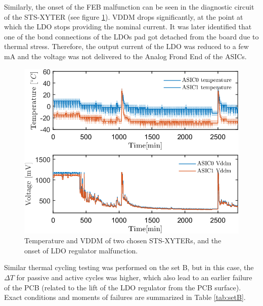 Similarly, the onset of the \gls{FEB} malfunction can be seen in the diagnostic circuit of the STS-XYTER (see figure \ref{fig_cold_startup_vddm}). VDDM drops significantly, at the point at which the \gls{LDO} stops providing the nominal current. It was later identified that one of the bond connections of the \glspl{LDO} pad got detached from the board due
to thermal stress. Therefore, the output current of the \gls{LDO} was reduced to a few mA and the voltage was not delivered to the Analog Frond End of the \glspl{ASIC}.

\begin{figure}[!h]
\centering
\includegraphics[width=0.6\columnwidth]{Chapter4/images/temps_vddm.png}
\caption{Temperature and VDDM of two chosen STS-XYTERs, and the onset of \gls{LDO} regulator malfunction.}
\label{fig_cold_startup_vddm}
\end{figure}

Similar thermal cycling testing was performed on the set B, but in this case, the $\Delta T$ for passive and active cycles was higher, which also lead to an earlier failure of the \gls{PCB} (related to the lift of the \gls{LDO} regulator from the \gls{PCB} surface). Exact conditions and moments of failures are summarized in Table \ref{tab:setB}.

